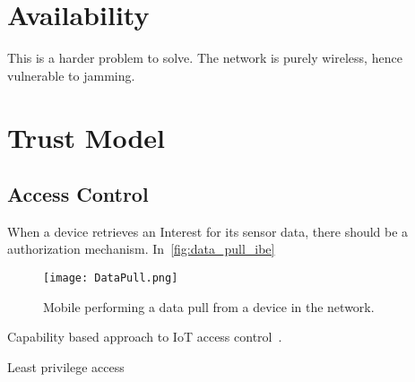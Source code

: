 \section{Availability}

This is a harder problem to solve.
The network is purely wireless, hence vulnerable to jamming. 

\section{Trust Model}


\subsection{Access Control}

When a device retrieves an Interest for its sensor data, there should be a authorization mechanism. 
In~\autoref{fig:data_pull_ibe} 
\begin{figure}[ht]
  \centering
  \texttt{[image: DataPull.png]}
  \caption{Mobile performing a data pull from a device in the network.}
  \label{fig:data_pull_ibe}
\end{figure}


Capability based approach to \gls{IoT} access control~\cite{DBLP:conf/imis/GusmeroliPR12}.

Least privilege access